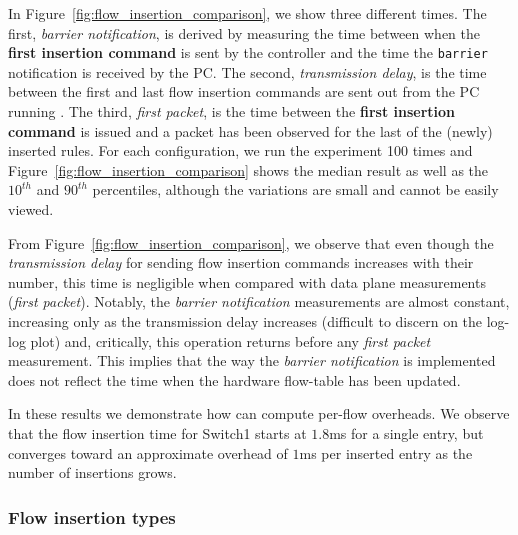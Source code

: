 In Figure~\ref{fig:flow_insertion_comparison}, we show three different times.
The first, {\it barrier notification}, is derived by measuring the time between
when the \textbf{first insertion command} is sent by the \oflops controller and
the time the \texttt{barrier} notification is received by the PC. The second,
{\it transmission delay}, is the time between the first and last flow insertion
commands are sent out from the PC running \oflops.  The third, {\it first
  packet}, is the time between the \textbf{first insertion command} is issued
and a packet has been observed for the last of the (newly) inserted rules. For
each configuration, we run the experiment 100 times and
Figure~\ref{fig:flow_insertion_comparison} shows the median result as well as
the $10^{th}$ and $90^{th}$ percentiles, although the variations are small and
cannot be easily viewed.

From Figure~\ref{fig:flow_insertion_comparison}, we observe that even though the
{\it transmission delay} for sending flow insertion commands increases with
their number, this time is negligible when compared with data plane measurements
({\it first packet}). Notably, the {\it barrier notification} measurements are
almost constant, increasing only as the transmission delay increases (difficult
to discern on the log-log plot) and, critically, this operation returns before
any {\it first packet} measurement. This implies that the way the {\it barrier
  notification} is implemented does not reflect the time when the hardware
flow-table has been updated.

In these results we demonstrate how \oflops can compute per-flow overheads. We
observe that the flow insertion time for Switch1 starts at $1.8$ms for a single
entry, but converges toward an approximate overhead of $1$ms per inserted entry
as the number of insertions grows.

\subsubsection*{Flow insertion types}

